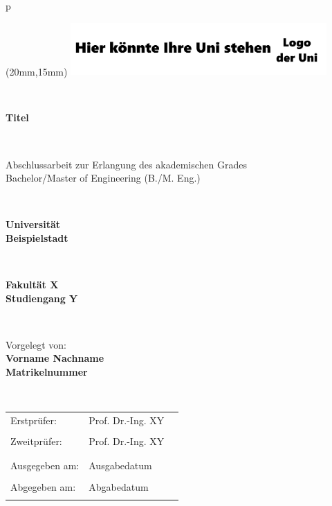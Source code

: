 \begin{center}
\begin{tabular}{p{\textwidth}}

\begin{textblock*}{50mm}(20mm,15mm)
\includegraphics[height=2cm]{images/UNI_Logo.png}
\end{textblock*}
\\
\vspace*{1cm}

\begin{center}
\LARGE{\textbf{
Titel}}
\end{center}
\\

\begin{center}
\large{Abschlussarbeit zur Erlangung des akademischen Grades\\ \vspace{3mm} Bachelor/Master of Engineering (B./M. Eng.)} \\
\end{center}

\\
\begin{center}
\textbf{\Huge{Universität \\Beispielstadt\\}}
\end{center}
\\
\begin{center}
\large{\textbf{Fakultät X\\ \vspace{2mm} Studiengang Y}} 
\end{center}
\\

\begin{center}
\large{Vorgelegt von:\\ \textbf{Vorname Nachname}} \\
\large{\textbf{Matrikelnummer}}\\
\end{center}

\\

\begin{center}
\begin{tabular}{lll}
\large{Erstprüfer:} & \large Prof. Dr.-Ing. XY\\
\\
\large{Zweitprüfer:} & \large Prof. Dr.-Ing. XY\\
\\
\\
\large{Ausgegeben am:}  & \large Ausgabedatum\\
\\
\large{Abgegeben am:}  & \large Abgabedatum\\
\\
\end{tabular}
\end{center}

\end{tabular}
\end{center}
